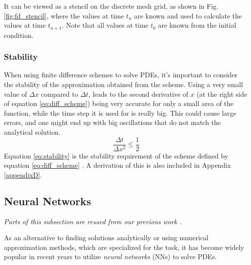 It can be viewed as a stencil on the discrete mesh grid, as shown in Fig. \ref{fig:fd_stencil}, where the values at time $t_n$ are known and used to calculate the values at time $t_{n+1}$.
Note that all values at time $t_0$ are known from the initial condition.
\subsubsection{Stability}\label{sec:stability}
When using finite difference schemes to solve PDEs, it's important to consider the stability of the approximation obtained from the scheme.
Using a very small value of $\Delta x$ compared to $\Delta t$, leads to the second derivative of $x$ (at the right side of equation \ref{eq:diff_scheme}) being very accurate for only a small area of the function, while the time step it is used for is really big.
This could cause large errors, and one might end up with big oscillations that do not match the analytical solution.
\begin{equation}
    \label{eq:stability}
    \frac{\Delta t}{\Delta x^2} \leq \frac{1}{2}
\end{equation}
Equation \ref{eq:stability} is the stability requirement of the scheme defined by equation \ref{eq:diff_scheme} \citep[p. 130]{tveitoPDE}.
A derivation of this is also included in Appendix \ref{appendixD}.

\subsection{Neural Networks} \label{sec:NN}
\textit{Parts of this subsection are reused from our previous work \citep[p. 7-10]{project2}.}

As an alternative to finding solutions analytically or using numerical approximation methods, which are specialized for the task, it has become widely popular in recent years to utilize \textit{neural networks} (NNs) to solve PDEs.


